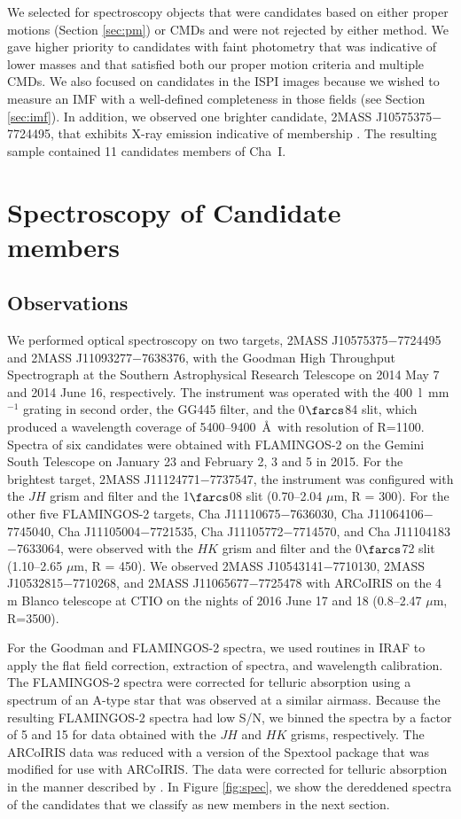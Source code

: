 \documentclass{emulateapj}
\begin{document}
We selected for spectroscopy objects that were candidates based on either
proper motions (Section \ref{sec:pm}) or CMDs and were not rejected by either
method. We gave higher priority to candidates with faint photometry that was
indicative of lower masses
and that satisfied both our proper motion criteria and multiple CMDs.
We also focused on candidates in the ISPI images because we wished 
to measure an IMF with a well-defined
completeness in those fields (see Section \ref{sec:imf}). 
In addition, we observed one brighter candidate, 2MASS J10575375$-$7724495, 
that exhibits X-ray emission indicative of membership \citep{ing11}. 
The resulting sample contained 11 candidates members of Cha~I.


\section{Spectroscopy of Candidate members}
 \label{sec:spec}

\subsection{Observations}

We performed optical spectroscopy on two targets, 
2MASS J10575375$-$7724495 and 2MASS J11093277$-$7638376,
with the Goodman High Throughput Spectrograph 
at the Southern Astrophysical Research Telescope on 2014 May 7 and 2014 June 16,
respectively. The instrument was operated with the 400~l~mm$^{-1}$ grating
in second order, the GG445 filter, and the 0$\farcs$84 slit, which produced
a wavelength coverage of 5400--9400~\AA\ with resolution of R=1100.
Spectra of six candidates were obtained with FLAMINGOS-2 on the Gemini South
Telescope \citep{eik04} on January 23 and February 2, 3 and 5 in 2015. 
For the brightest target, 2MASS J11124771$-$7737547, the instrument was
configured with the $JH$ grism and filter and the 1$\farcs$08 slit
(0.70--2.04 $\mu$m, R = 300).
For the other five FLAMINGOS-2 targets, 
Cha J11110675$-$7636030, 
Cha J11064106$-$7745040, 
Cha J11105004$-$7721535, 
Cha J11105772$-$7714570, and 
Cha J11104183$-$7633064, 
were observed with the $HK$ grism and filter and the 0$\farcs$72 slit
(1.10--2.65 $\mu$m, R = 450). We observed 2MASS J10543141$-$7710130, 
2MASS J10532815$-$7710268, and 2MASS J11065677$-$7725478 with ARCoIRIS on
the 4 m Blanco telescope at CTIO on the nights of 2016 June 17 and 18
(0.8--2.47 $\mu$m, R=3500).

For the Goodman and FLAMINGOS-2 spectra, we used routines in IRAF to apply
the flat field correction, extraction of spectra, and wavelength calibration. 
The FLAMINGOS-2 spectra were corrected for telluric absorption using 
a spectrum of an A-type star that was observed at a similar airmass. 
Because the resulting FLAMINGOS-2 spectra had low S/N, we binned the
spectra by a factor of 5 and 15 for data obtained with the $JH$ and $HK$
grisms, respectively. The ARCoIRIS data was reduced with a version
of the Spextool package \citep{cus04} that was modified for use with ARCoIRIS.
The data were corrected for telluric absorption in the manner described
by \cite{vac03}. In Figure \ref{fig:spec},
we show the dereddened spectra of the candidates that we 
classify as new members in the next section. 
\end{document}
